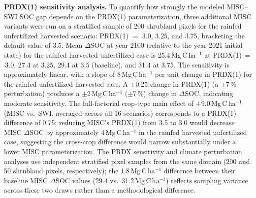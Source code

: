\documentclass[11pt]{article}
\begin{document}
\textbf{PRDX(1) sensitivity analysis.} To quantify how strongly the modeled MISC--SWI SOC gap depends on the PRDX(1) parameterization, three additional MISC variants were run on a stratified sample of 200 shrubland pixels for the rainfed unfertilized harvested scenario: PRDX(1) $=$ 3.0, 3.25, and 3.75, bracketing the default value of 3.5. Mean $\Delta$SOC at year 2100 (relative to the year-2021 initial state) for the rainfed harvested unfertilized case is 25.4\,Mg\,C\,ha$^{-1}$ at PRDX(1)\,$=$\,3.0, 27.4 at 3.25, 29.4 at 3.5 (baseline), and 31.4 at 3.75. The sensitivity is approximately linear, with a slope of 8\,Mg\,C\,ha$^{-1}$ per unit change in PRDX(1) for the rainfed unfertilized harvested case. A $\pm$0.25 change in PRDX(1) (a $\pm$7\,\% perturbation) produces a $\pm$2\,Mg\,C\,ha$^{-1}$ ($\pm$7\,\%) change in $\Delta$SOC, indicating moderate sensitivity. The full-factorial crop-type main effect of $+9.0$\,Mg\,C\,ha$^{-1}$ (MISC vs.\ SWI, averaged across all 16 scenarios) corresponds to a PRDX(1) difference of 0.75; reducing MISC's PRDX(1) from 3.5 to 3.0 would decrease MISC $\Delta$SOC by approximately 4\,Mg\,C\,ha$^{-1}$ in the rainfed harvested unfertilized case, suggesting the cross-crop difference would narrow substantially under a lower MISC parameterization. The PRDX sensitivity and climate perturbation analyses use independent stratified pixel samples from the same domain (200 and 50 shrubland pixels, respectively); the 1.8\,Mg\,C\,ha$^{-1}$ difference between their baseline MISC $\Delta$SOC values (29.4 vs.\ 31.2\,Mg\,C\,ha$^{-1}$) reflects sampling variance across these two draws rather than a methodological difference.
\end{document}
